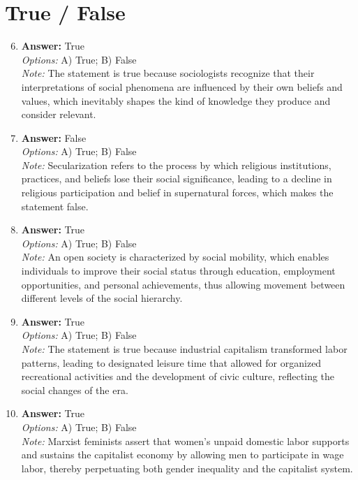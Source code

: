 \documentclass[12pt]{article}
\begin{document}
\section*{True / False}
\begin{enumerate}[label=\arabic*.]
\setcounter{enumi}{5}
\item \textbf{Answer:} True
\\ \textit{Options:} A) True; B) False
\\ \textit{Note:} The statement is true because sociologists recognize that their interpretations of social phenomena are influenced by their own beliefs and values, which inevitably shapes the kind of knowledge they produce and consider relevant.
\item \textbf{Answer:} False
\\ \textit{Options:} A) True; B) False
\\ \textit{Note:} Secularization refers to the process by which religious institutions, practices, and beliefs lose their social significance, leading to a decline in religious participation and belief in supernatural forces, which makes the statement false.
\item \textbf{Answer:} True
\\ \textit{Options:} A) True; B) False
\\ \textit{Note:} An open society is characterized by social mobility, which enables individuals to improve their social status through education, employment opportunities, and personal achievements, thus allowing movement between different levels of the social hierarchy.
\item \textbf{Answer:} True
\\ \textit{Options:} A) True; B) False
\\ \textit{Note:} The statement is true because industrial capitalism transformed labor patterns, leading to designated leisure time that allowed for organized recreational activities and the development of civic culture, reflecting the social changes of the era.
\item \textbf{Answer:} True
\\ \textit{Options:} A) True; B) False
\\ \textit{Note:} Marxist feminists assert that women's unpaid domestic labor supports and sustains the capitalist economy by allowing men to participate in wage labor, thereby perpetuating both gender inequality and the capitalist system.
\end{enumerate}
\end{document}
